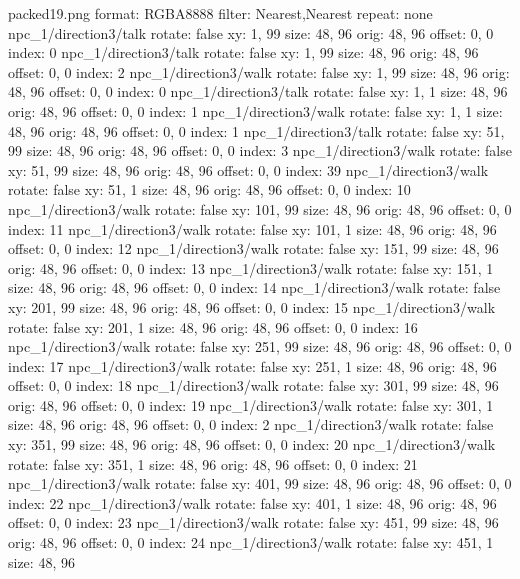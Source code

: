 packed19.png
format: RGBA8888
filter: Nearest,Nearest
repeat: none
npc_1/direction3/talk
  rotate: false
  xy: 1, 99
  size: 48, 96
  orig: 48, 96
  offset: 0, 0
  index: 0
npc_1/direction3/talk
  rotate: false
  xy: 1, 99
  size: 48, 96
  orig: 48, 96
  offset: 0, 0
  index: 2
npc_1/direction3/walk
  rotate: false
  xy: 1, 99
  size: 48, 96
  orig: 48, 96
  offset: 0, 0
  index: 0
npc_1/direction3/talk
  rotate: false
  xy: 1, 1
  size: 48, 96
  orig: 48, 96
  offset: 0, 0
  index: 1
npc_1/direction3/walk
  rotate: false
  xy: 1, 1
  size: 48, 96
  orig: 48, 96
  offset: 0, 0
  index: 1
npc_1/direction3/talk
  rotate: false
  xy: 51, 99
  size: 48, 96
  orig: 48, 96
  offset: 0, 0
  index: 3
npc_1/direction3/walk
  rotate: false
  xy: 51, 99
  size: 48, 96
  orig: 48, 96
  offset: 0, 0
  index: 39
npc_1/direction3/walk
  rotate: false
  xy: 51, 1
  size: 48, 96
  orig: 48, 96
  offset: 0, 0
  index: 10
npc_1/direction3/walk
  rotate: false
  xy: 101, 99
  size: 48, 96
  orig: 48, 96
  offset: 0, 0
  index: 11
npc_1/direction3/walk
  rotate: false
  xy: 101, 1
  size: 48, 96
  orig: 48, 96
  offset: 0, 0
  index: 12
npc_1/direction3/walk
  rotate: false
  xy: 151, 99
  size: 48, 96
  orig: 48, 96
  offset: 0, 0
  index: 13
npc_1/direction3/walk
  rotate: false
  xy: 151, 1
  size: 48, 96
  orig: 48, 96
  offset: 0, 0
  index: 14
npc_1/direction3/walk
  rotate: false
  xy: 201, 99
  size: 48, 96
  orig: 48, 96
  offset: 0, 0
  index: 15
npc_1/direction3/walk
  rotate: false
  xy: 201, 1
  size: 48, 96
  orig: 48, 96
  offset: 0, 0
  index: 16
npc_1/direction3/walk
  rotate: false
  xy: 251, 99
  size: 48, 96
  orig: 48, 96
  offset: 0, 0
  index: 17
npc_1/direction3/walk
  rotate: false
  xy: 251, 1
  size: 48, 96
  orig: 48, 96
  offset: 0, 0
  index: 18
npc_1/direction3/walk
  rotate: false
  xy: 301, 99
  size: 48, 96
  orig: 48, 96
  offset: 0, 0
  index: 19
npc_1/direction3/walk
  rotate: false
  xy: 301, 1
  size: 48, 96
  orig: 48, 96
  offset: 0, 0
  index: 2
npc_1/direction3/walk
  rotate: false
  xy: 351, 99
  size: 48, 96
  orig: 48, 96
  offset: 0, 0
  index: 20
npc_1/direction3/walk
  rotate: false
  xy: 351, 1
  size: 48, 96
  orig: 48, 96
  offset: 0, 0
  index: 21
npc_1/direction3/walk
  rotate: false
  xy: 401, 99
  size: 48, 96
  orig: 48, 96
  offset: 0, 0
  index: 22
npc_1/direction3/walk
  rotate: false
  xy: 401, 1
  size: 48, 96
  orig: 48, 96
  offset: 0, 0
  index: 23
npc_1/direction3/walk
  rotate: false
  xy: 451, 99
  size: 48, 96
  orig: 48, 96
  offset: 0, 0
  index: 24
npc_1/direction3/walk
  rotate: false
  xy: 451, 1
  size: 48, 96
